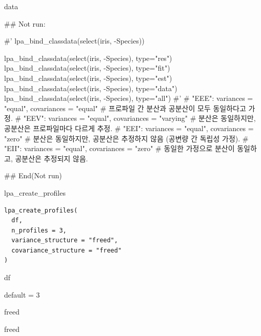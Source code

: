 \documentclass[a4paper]{book}
\begin{document}
%
\begin{Value}
data
\end{Value}
%
\begin{Examples}
\begin{ExampleCode}

\#\# Not run: 

#'
lpa_bind_classdata(select(iris, -Species))

lpa_bind_classdata(select(iris, -Species), type="res")
lpa_bind_classdata(select(iris, -Species), type="fit")
lpa_bind_classdata(select(iris, -Species), type="est")
lpa_bind_classdata(select(iris, -Species), type="data")%
lpa_bind_classdata(select(iris, -Species), type="all")
#'
# "EEE": variances = "equal", covariances = "equal"
# 프로파일 간 분산과 공분산이 모두 동일하다고 가정.
# "EEV": variances = "equal", covariances = "varying"
# 분산은 동일하지만, 공분산은 프로파일마다 다르게 추정.
# "EEI": variances = "equal", covariances = "zero"
# 분산은 동일하지만, 공분산은 추정하지 않음 (공변량 간 독립성 가정).
# "EII": variances = "equal", covariances = "zero"
# 동일한 가정으로 분산이 동일하고, 공분산은 추정되지 않음.

## End(Not run)



\end{ExampleCode}
\end{Examples}
%
\begin{Description}
lpa\_create\_profiles
\end{Description}
%
\begin{Usage}
\begin{verbatim}
lpa_create_profiles(
  df,
  n_profiles = 3,
  variance_structure = "freed",
  covariance_structure = "freed"
)
\end{verbatim}
\end{Usage}
%
\begin{Arguments}
\begin{ldescription}
\item[\code{df}] df

\item[\code{n\_profiles}] default = 3

\item[\code{variance\_structure}] freed

\item[\code{covariance\_structure}] freed
\end{ldescription}
\end{Arguments}
\end{document}
